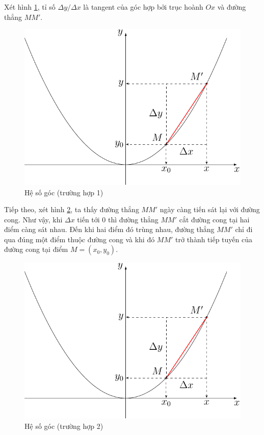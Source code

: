 Xét hình \ref{int2a}, tỉ số $\Delta y / \Delta x$ là tangent của góc hợp bởi trục hoành $Ox$ và đường thẳng $MM'$.

\begin{figure}[ht]
	\centering
	\includegraphics[page=1,scale=0.75]{analytic_geometry/int2.pdf}
	\caption{Hệ số góc (trường hợp 1)}
	\label{int2a}
\end{figure}

Tiếp theo, xét hình \ref{int2b}, ta thấy đường thẳng $MM'$ ngày càng tiến sát lại với đường cong. Như vậy, khi $\Delta x$ tiến tới 0 thì đường thẳng $MM'$ cắt đường cong tại hai điểm càng sát nhau. Đến khi hai điểm đó trùng nhau, đường thẳng $MM'$ chỉ đi qua đúng một điểm thuộc đường cong và khi đó $MM'$ trở thành tiếp tuyến của đường cong tại điểm $M = (x_0, y_0)$.

\begin{figure}[ht]
	\centering
	\includegraphics[page=2,scale=0.75]{analytic_geometry/int2.pdf}
	\caption{Hệ số góc (trường hợp 2)}
	\label{int2b}
\end{figure}

